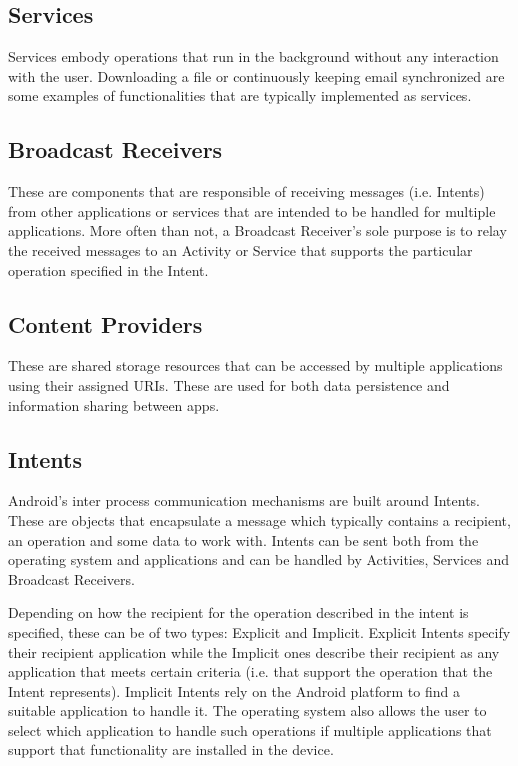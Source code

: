 \documentclass[conference]{IEEEtran}
\begin{document}
\subsection{Services}

Services embody operations that run in the background without any interaction with the user. Downloading a file or continuously keeping email synchronized are some examples of functionalities that are typically implemented as services.

\subsection{Broadcast Receivers}

These are components that are responsible of receiving messages (i.e. Intents) from other applications or services that are intended to be handled for multiple applications. More often than not, a Broadcast Receiver's sole purpose is to relay the received messages to an Activity or Service that supports the particular operation specified in the Intent.

\subsection{Content Providers}

These are shared storage resources that can be accessed by multiple applications using their assigned URIs. These are used for both data persistence and information sharing between apps.

\subsection{Intents}

Android's inter process communication mechanisms are built around Intents. These are objects that encapsulate a message which typically contains a recipient, an operation and some data to work with. Intents can be sent both from the operating system and applications and can be handled by Activities, Services and Broadcast Receivers.

Depending on how the recipient for the operation described in the intent is specified, these can be of two types: Explicit and Implicit. Explicit Intents specify their recipient application while the Implicit ones describe their recipient as any application that meets certain criteria (i.e. that support the operation that the Intent represents). Implicit Intents rely on the Android platform to find a suitable application to handle it. The operating system also allows the user to select which application to handle such operations if multiple applications that support that functionality are installed in the device.
\end{document}

